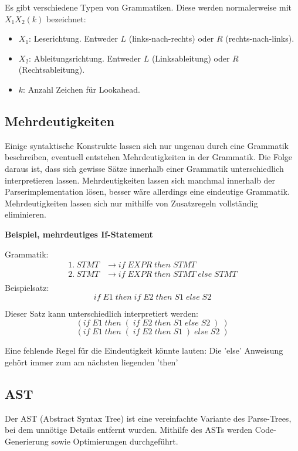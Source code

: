 Es gibt verschiedene Typen von Grammatiken. Diese werden normalerweise mit
$X_1X_2(k)$ bezeichnet:
\begin{itemize}
	\item $X_1$: Leserichtung. Entweder $L$ (links-nach-rechts) oder $R$ (rechts-nach-links).
	\item $X_2$: Ableitungsrichtung. Entweder $L$ (Linksableitung) oder $R$
		(Rechtsableitung).
	\item $k$: Anzahl Zeichen für Lookahead.
\end{itemize}

\subsection{Mehrdeutigkeiten}

Einige syntaktische Konstrukte lassen sich nur ungenau durch eine Grammatik beschreiben, eventuell entstehen Mehrdeutigkeiten in der Grammatik. Die Folge daraus ist, dass sich gewisse Sätze innerhalb einer Grammatik unterschiedlich interpretieren lassen. Mehrdeutigkeiten lassen sich manchmal innerhalb der Parserimplementation lösen, besser wäre allerdings eine eindeutige Grammatik. Mehrdeutigkeiten lassen sich nur mithilfe von Zusatzregeln vollständig eliminieren.

\textbf{Beispiel, mehrdeutiges If-Statement}

Grammatik:
\begin{align*}
	1.~STMT &\rightarrow if \; EXPR \; then \; STMT \\
	2.~STMT &\rightarrow if \; EXPR \; then \; STMT \; else \; STMT \\
\end{align*}
Beispielsatz: 
\[
	if \; E1 \; then \; if \; E2 \; then \; S1 \; else \; S2
\]

Dieser Satz kann unterschiedlich interpretiert werden:
\[
	(if \; E1 \; then \; ( \; if \; E2 \; then \; S1 \; else \; S2 \; ) \; )
\]
\[
	(if \; E1 \; then \; ( \; if \; E2 \; then \; S1 \; ) \; else \; S2 \; )
\]

Eine fehlende Regel für die Eindeutigkeit könnte lauten: Die 'else' Anweisung gehört immer zum am nächsten liegenden 'then'

\subsection{AST}

Der AST (Abstract Syntax Tree) ist eine vereinfachte Variante des Parse-Trees,
bei dem unnötige Details entfernt wurden. Mithilfe des ASTs werden
Code-Generierung sowie Optimierungen durchgeführt.


